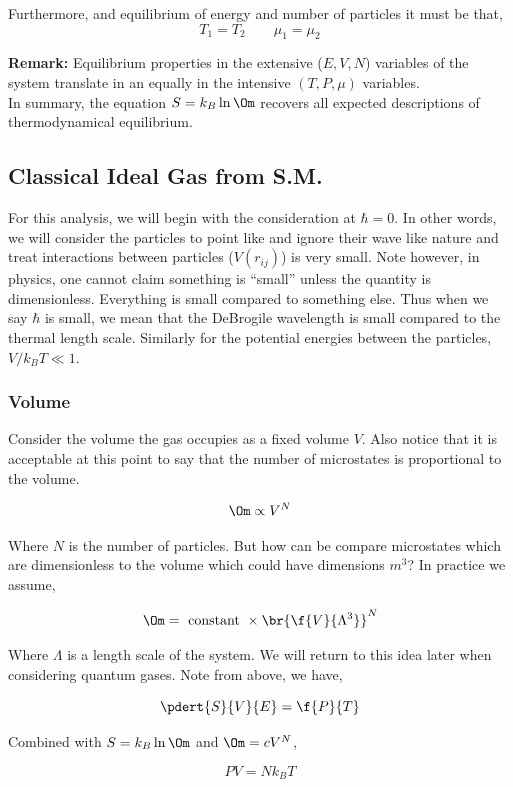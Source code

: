 \documentclass{article}
\begin{document}
Furthermore, and equilibrium of energy and number of particles it must be that,
\[ T_1 = T_2 \qquad \mu_1 = \mu_2 \]

\textbf{Remark:} Equilibrium properties in the extensive ($E, V, N$) variables of the system translate in an equally in the intensive $(T, P, \mu)$ variables. \\

In summary, the equation $S = k_B \ln \Om$ recovers all expected descriptions of thermodynamical equilibrium.

\subsection{Classical Ideal Gas from S.M.}

For this analysis, we will begin with the consideration at $\hbar = 0$. In other words, we will consider the particles to point like and ignore their wave like nature and treat interactions between particles ($V(r_{ij})$) is very small. Note however, in physics, one cannot claim something is ``small'' unless the quantity is dimensionless. Everything is small compared to something else. Thus when we say $\hbar$ is small, we mean that the DeBrogile wavelength is small compared to the thermal length scale. Similarly for the potential energies between the particles, $V/k_BT \ll 1$. \\

\subsubsection{Volume}
Consider the volume the gas occupies as a fixed volume $V$. Also notice that it is acceptable at this point to say that the number of microstates is proportional to the volume.

\[\Om \propto V^N \]

Where $N$ is the number of particles. But how can be compare microstates which are dimensionless to the volume which could have dimensions $m^3$? In practice we assume,

\[ \Om = \text{ constant } \times \br{\f{V}{\Lambda^3}}^N \]

Where $\Lambda$ is a length scale of the system. We will return to this idea later when considering quantum gases. Note from above, we have,

\[ \pdert{S}{V}{E} = \f{P}{T} \]

Combined with $S = k_B\ln\Om$ and $\Om = c V^N$,

\[ PV = N k_B T \]
\end{document}
